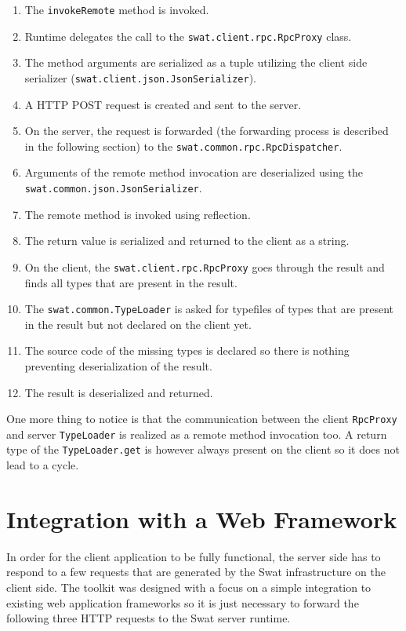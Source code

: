 \documentclass[12pt,a4paper]{report}
\begin{document}
\begin{enumerate}
\item The \texttt{invokeRemote} method is invoked.
\item Runtime delegates the call to the \texttt{swat.client.rpc.RpcProxy} class.
\item The method arguments are serialized as a tuple utilizing the client side serializer (\texttt{swat.client.json.JsonSerializer}).
\item A HTTP POST request is created and sent to the server.
\item On the server, the request is forwarded (the forwarding process is described in the following section) to the \texttt{swat.common.rpc.RpcDispatcher}.
\item Arguments of the remote method invocation are deserialized using the \texttt{swat.common.json.JsonSerializer}.
\item The remote method is invoked using reflection.
\item The return value is serialized and returned to the client as a string.
\item On the client, the \texttt{swat.client.rpc.RpcProxy} goes through the result and finds all types that are present in the result.
\item The \texttt{swat.common.TypeLoader} is asked for typefiles of types that are present in the result but not declared on the client yet.
\item The source code of the missing types is declared so there is nothing preventing deserialization of the result.
\item The result is deserialized and returned.
\end{enumerate}

One more thing to notice is that the communication between the client \texttt{RpcProxy} and server \texttt{TypeLoader} is realized as a remote method invocation too. A return type of the \texttt{TypeLoader.get} is however always present on the client so it does not lead to a cycle.

\section{Integration with a Web Framework}

In order for the client application to be fully functional, the server side has to respond to a few requests that are generated by the Swat infrastructure on the client side. The toolkit was designed with a focus on a simple integration to existing web application frameworks so it is just necessary to forward the following three HTTP requests to the Swat server runtime.
\end{document}
